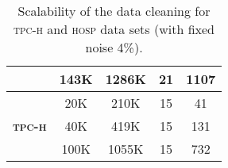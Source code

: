 \begin{table}[t]
\begin{tabular}{@{}ccccc@{}}
\multicolumn{1}{l}{} & 143K                                                             & 1286K                                                        & 21                                                                                                                                        & 1107                                                          \\ \midrule
\multicolumn{1}{l}{} & 20K                                                              & 210K                                                        & 15                                                                                                                                        & 41                                                            \\
{\bf \textsc{tpc-h}}           & 40K                                                              & 419K                                                        & 15                                                                                                                                        & 131                                                           \\
\multicolumn{1}{l}{} & 100K                                                             & 1055K                                                        & 15                                                                                                                                        & 732                                                           \\ \bottomrule
\end{tabular}
\caption{\label{tab:runtime} Scalability of the data cleaning for \textsc{tpc-h} and \textsc{hosp} data sets (with fixed noise 4\%). }
\end{table}


